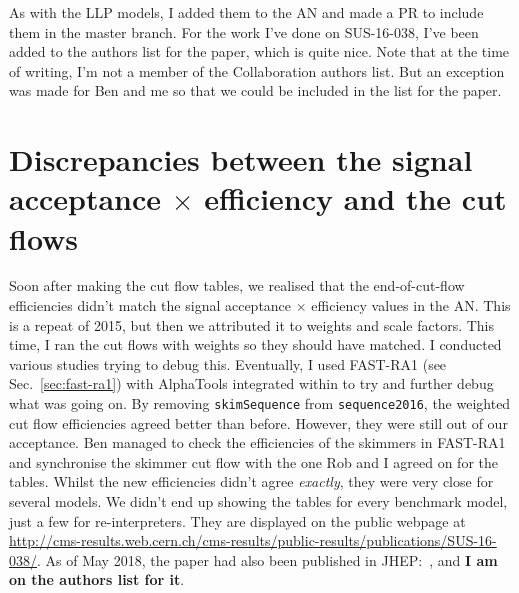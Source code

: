 As with the LLP models, I added them to the AN and made a PR to include them in the master branch. For the work I've done on SUS-16-038, I've been added to the authors list for the paper, which is quite nice. Note that at the time of writing, I'm not a member of the Collaboration authors list. But an exception was made for Ben and me so that we could be included in the list for the paper.


\section{Discrepancies between the signal acceptance \texorpdfstring{$\times$}{x} efficiency and the cut flows}

Soon after making the cut flow tables, we realised that the end-of-cut-flow efficiencies didn't match the signal acceptance $\times$ efficiency values in the AN. This is a repeat of 2015, but then we attributed it to weights and scale factors. This time, I ran the cut flows with weights so they should have matched. I conducted various studies trying to debug this. Eventually, I used FAST-RA1 (see Sec.~\ref{sec:fast-ra1}) with AlphaTools integrated within to try and further debug what was going on. By removing \texttt{skimSequence} from \texttt{sequence2016}, the weighted cut flow efficiencies agreed better than before. However, they were still out of our acceptance. Ben managed to check the efficiencies of the skimmers in FAST-RA1 and synchronise the skimmer cut flow with the one Rob and I agreed on for the tables. Whilst the new efficiencies didn't agree \emph{exactly}, they were very close for several models. We didn't end up showing the tables for every benchmark model, just a few for re-interpreters.
They are displayed on the public webpage at \url{http://cms-results.web.cern.ch/cms-results/public-results/publications/SUS-16-038/}. As of May 2018, the paper had also been published in JHEP:~\cite{SUS16038published}, and \textbf{I am on the authors list for it}.
